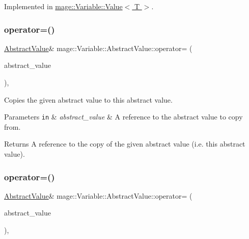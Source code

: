 Implemented in \hyperlink{structmage_1_1_variable_1_1_value_a04d70496ebb7ad71dafa3df877daeb26}{mage\+::\+Variable\+::\+Value$<$ T $>$}.

\hypertarget{structmage_1_1_variable_1_1_abstract_value_a77f7107e78716a0ea76cfaedd0a50a4b}{}\label{structmage_1_1_variable_1_1_abstract_value_a77f7107e78716a0ea76cfaedd0a50a4b} 
\subsubsection{\texorpdfstring{operator=()}{operator=()}\hspace{0.1cm}{\footnotesize\ttfamily [1/2]}}
{\footnotesize\ttfamily \hyperlink{structmage_1_1_variable_1_1_abstract_value}{Abstract\+Value}\& mage\+::\+Variable\+::\+Abstract\+Value\+::operator= (\begin{DoxyParamCaption}\item[{const \hyperlink{structmage_1_1_variable_1_1_abstract_value}{Abstract\+Value} \&}]{abstract\+\_\+value }\end{DoxyParamCaption})\hspace{0.3cm}{\ttfamily [private]}, {\ttfamily [delete]}}

Copies the given abstract value to this abstract value.


\begin{DoxyParams}[1]{Parameters}
\mbox{\tt in}  & {\em abstract\+\_\+value} & A reference to the abstract value to copy from. \\
\hline
\end{DoxyParams}
\begin{DoxyReturn}{Returns}
A reference to the copy of the given abstract value (i.\+e. this abstract value). 
\end{DoxyReturn}
\hypertarget{structmage_1_1_variable_1_1_abstract_value_a4aac7aa9278054361c478b4b8a457e6e}{}\label{structmage_1_1_variable_1_1_abstract_value_a4aac7aa9278054361c478b4b8a457e6e} 
\subsubsection{\texorpdfstring{operator=()}{operator=()}\hspace{0.1cm}{\footnotesize\ttfamily [2/2]}}
{\footnotesize\ttfamily \hyperlink{structmage_1_1_variable_1_1_abstract_value}{Abstract\+Value}\& mage\+::\+Variable\+::\+Abstract\+Value\+::operator= (\begin{DoxyParamCaption}\item[{\hyperlink{structmage_1_1_variable_1_1_abstract_value}{Abstract\+Value} \&\&}]{abstract\+\_\+value }\end{DoxyParamCaption})\hspace{0.3cm}{\ttfamily [private]}, {\ttfamily [delete]}}

